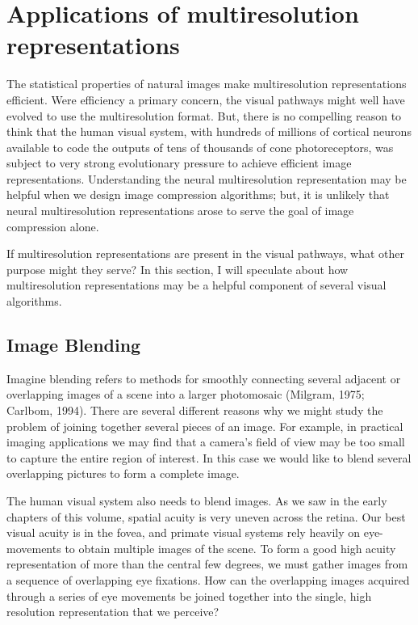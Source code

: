 \section{Applications of multiresolution representations}

The statistical properties of natural images
make multiresolution representations efficient.
Were efficiency a primary
concern, the visual pathways
might well have evolved to use the multiresolution format.
But, there is no compelling reason to think that
the human visual system, with hundreds of
millions of cortical neurons 
available to code the outputs of tens of thousands
of cone photoreceptors,
was subject to very strong evolutionary pressure to
achieve efficient image representations.
Understanding the neural multiresolution representation
may be helpful when we design image compression algorithms;
but, it is unlikely that neural multiresolution representations
arose to serve the goal of image compression alone.

If multiresolution representations are present in the
visual pathways, what other purpose might they serve?
In this section, 
I will speculate about how multiresolution representations
may be a helpful component of
several visual algorithms.

\subsection*{Image Blending}

Imagine blending refers to methods for smoothly
connecting several adjacent or overlapping
images of a scene
into a larger photomosaic (Milgram, 1975;  Carlbom, 1994).
There are several different reasons why we
might study the problem of joining together
several pieces of an image.
For example, in practical imaging applications
we may find that a camera's field of view may be too small
to capture the entire region of interest.
In this case we would like to blend several
overlapping pictures to form a complete image.

The human visual system also needs to blend images.  As we saw in the
early chapters of this volume, spatial acuity is very uneven across
the retina.  Our best visual acuity is in the fovea, and primate
visual systems rely heavily on eye-movements to obtain multiple images
of the scene.  To form a good high acuity representation of more than
the central few degrees, we must gather images from a sequence of
overlapping eye fixations.  How can the overlapping images acquired
through a series of eye movements be joined together into the single,
high resolution representation that we perceive?

